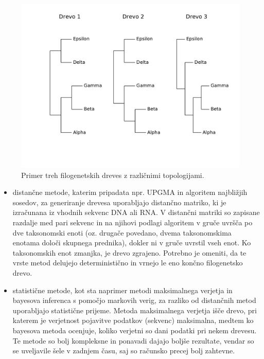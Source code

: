 \documentclass[a4paper, 12pt]{book}
\begin{document}
\begin{figure}
	\begin{center}
		\includegraphics[scale=0.7, clip=true, trim=0 3cm 0 9mm]{gfx/input_trees_ex.pdf}
	\end{center}
	\caption{Primer treh filogenetskih dreves z različnimi topologijami.}
	\label{img-input-trees}
\end{figure}

\begin{itemize}
	\item distančne metode, katerim pripadata npr. UPGMA in algoritem najbližjih sosedov, za generiranje drevesa uporabljajo distančno matriko, ki je izračunana iz vhodnih sekvenc DNA ali RNA. V distančni matriki so zapisane razdalje med pari sekvenc in na njihovi podlagi algoritem v gruče uvršča po dve taksonomski enoti (oz. drugače povedano, dvema taksonomskima enotama določi skupnega prednika), dokler ni v gruče uvrstil vseh enot. Ko taksonomskih enot zmanjka, je drevo zgrajeno. Potrebno je omeniti, da te vrste metod delujejo deterministično in vrnejo le eno končno filogenetsko drevo.
	\item statistične metode, kot sta naprimer metodi maksimalnega verjetja in bayesova inferenca s pomočjo markovih verig, za razliko od distančnih metod uporabljajo statistične prijeme. Metoda maksimalnega verjetja išče drevo, pri katerem je verjetnost pojavitve podatkov (sekvenc) maksimalna, medtem ko bayesova metoda ocenjuje, koliko verjetni so dani podatki pri nekem drevesu. Te metode so bolj kompleksne in ponavadi dajajo boljše rezultate, vendar so se uveljavile šele v zadnjem času, saj so računsko precej bolj zahtevne.
\end{itemize}
\end{document}
